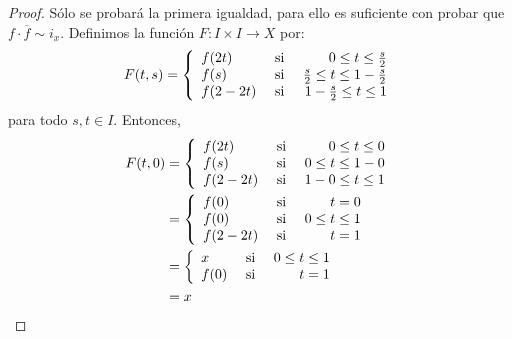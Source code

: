 \documentclass[12pt]{report}
\theoremstyle{largebreak}
\newcommand\cf[3]{\ensuremath{#1:#2\rightarrow#3}}
\begin{document}
    \begin{proof}
        Sólo se probará la primera igualdad, para ello es suficiente con probar que $f\cdot\overline{f}\sim i_x$. Definimos la función $\cf{F}{I\times I}{X}$ por:
        \begin{equation*}
            F(t,s)=\left\{
                \begin{array}{lcr}
                    f(2t) & \textup{ si } & 0\leq t\leq\frac{s}{2}\\
                    f(s) & \textup{ si } & \frac{s}{2}\leq t\leq1-\frac{s}{2}\\
                    f(2-2t) & \textup{ si } & 1-\frac{s}{2}\leq t\leq1\\
                \end{array}
            \right.
        \end{equation*}
        para todo $s,t\in I$. Entonces,
        \begin{equation*}
            \begin{split}
                F(t,0)&=\left\{
                    \begin{array}{lcr}
                        f(2t) & \textup{ si } & 0\leq t\leq0\\
                        f(s) & \textup{ si } & 0\leq t\leq1-0\\
                        f(2-2t) & \textup{ si } & 1-0\leq t\leq1\\
                    \end{array}
                \right.\\
                &=\left\{
                    \begin{array}{lcr}
                        f(0) & \textup{ si } & t=0\\
                        f(0) & \textup{ si } & 0\leq t\leq1\\
                        f(2-2t) & \textup{ si } & t=1\\
                    \end{array}
                \right.\\
                &=\left\{
                    \begin{array}{lcr}
                        x & \textup{ si } & 0\leq t\leq1\\
                        f(0) & \textup{ si } & t=1\\
                    \end{array}
                \right.\\
                &=x\\

\end{split}
\end{equation*}
\end{proof}
\end{document}
